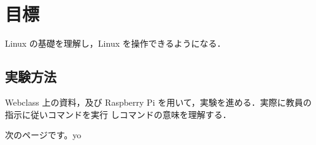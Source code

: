 \documentclass{daniel_style}  %
\begin{document}
\section{目標}
Linux の基礎を理解し，Linux を操作できるようになる．

\subsection{実験方法}
Webclass 上の資料，及び Raspberry Pi を用いて，実験を進める．実際に教員の指示に従いコマンドを実行
しコマンドの意味を理解する．

\newpage

次のページです。yo
\end{document}

